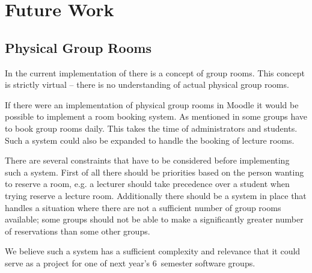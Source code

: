 \chapter{Future Work}
\label{chap:futurework}


\section{Physical Group Rooms}
In the current implementation of \system{} there is a concept of group rooms.
This concept is strictly virtual -- there is no understanding of actual physical group rooms.

If there were an implementation of physical group rooms in Moodle it would be possible to implement a room booking system.
As mentioned in  some groups have to book group rooms daily.
This takes the time of administrators and students.
Such a system could also be expanded to handle the booking of lecture rooms.

There are several constraints that have to be considered before implementing such a system.
First of all there should be priorities based on the person wanting to reserve a room, e.g. a lecturer should take precedence over a student when trying reserve a lecture room.
Additionally there should be a system in place that handles a situation where there are not a sufficient number of group rooms available; some groups should not be able to make a significantly greater number of reservations than some other groups.

We believe such a system has a sufficient complexity and relevance that it could serve as a project for one of next year's $6$\ths~semester software groups.
